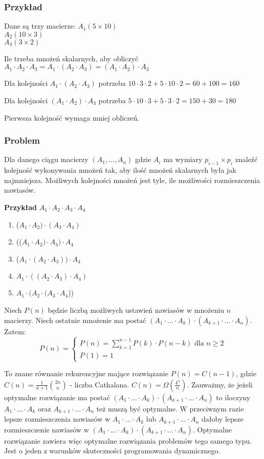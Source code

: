 \subsubsection{Przykład}
Dane są trzy macierze:
$ A_1 (5 \times 10) $\\ 
$ A_2 (10 \times 3) $\\
$ A_3 (3 \times 2) $


Ile trzeba mnożeń skalarnych, aby obliczyć $A_1 \cdot A_2 \cdot A_3 = A_1 \cdot (A_2 \cdot A_3) = (A_1 \cdot A_2) \cdot A_3$

Dla kolejności $A_1 \cdot (A_2 \cdot A_3)$ potrzeba $10 \cdot 3 \cdot 2 + 5 \cdot  10 \cdot 2 = 60 + 100 = 160$

Dla kolejności $(A_1 \cdot A_2) \cdot A_3$ potrzeba $5 \cdot 10 \cdot 3 + 5 \cdot 3 \cdot 2 = 150 + 30 = 180$

Pierwsza kolejność wymaga mniej obliczeń.

\subsubsection{Problem}
Dla danego ciągu macierzy $(A_1, ...,  A_n)$ gdzie $A_i$ ma wymiary $p_{i-1} \times p_i$ znaleźć kolejność wykonywania mnożeń tak, aby ilość mnożeń skalarnych była jak najmniejsza. 
Możliwych kolejności mnożeń jest tyle, ile możliwości rozmieszczenia nawiasów.

\textbf{Przykład} $A_1 \cdot A_2 \cdot A_3 \cdot A_4$
\begin{enumerate}
\item ($A_1 \cdot A_2) \cdot (A_3 \cdot A_4)$
\item (($A_1 \cdot A_2) \cdot A_3) \cdot A_4$
\item ($A_1 \cdot (A_2 \cdot A_3)) \cdot A_4$
\item $A_1 \cdot ((A_2 \cdot A_3) \cdot A_4)$
\item $A_1 \cdot (A_2 \cdot (A_3 \cdot A_4$))
\end{enumerate}
Niech $P(n)$ będzie liczbą możliwych ustawień nawiasów w mnożeniu $n$ macierzy. Niech ostatnie mnożenie ma postać $(A_1 \cdot ... \cdot A_k) \cdot (A_{k+1} \cdot ... \cdot A_n)$. Zatem:
$$
P(n) = 	\begin{cases}
		P(n) = \sum_{k=1}^{n-1} P(k) \cdot P(n-k) \text{ dla } n \geq 2 \\
		P(1) = 1
		\end{cases}
$$

To znane równanie rekurencyjne mające rozwiązanie $P(n) = C(n-1)$, gdzie $C(n) = \frac{1}{n+1}\binom{2n}{n}$ - liczba Cathalana. $C(n) = \Omega(\frac{4^n}{n})$. Zauważmy, że jeżeli optymalne rozwiązanie ma postać $(A_1 \cdot ... \cdot A_k) \cdot (A_{k+1} \cdot ... \cdot A_n)$ to iloczyny $A_1 \cdot ... \cdot A_k$ oraz $A_{k+1} \cdot ... \cdot A_n$  też muszą być optymalne. W przeciwnym razie lepsze rozmieszczenia nawiasów w $A_1 \cdot ... \cdot A_k$ lub $A_{k+1} \cdot ... \cdot A_n$ dałoby lepsze rozmieszczenie nawiasów w $(A_1 \cdot ... \cdot A_k) \cdot (A_{k+1} \cdot ... \cdot A_n)$. Optymalne rozwiązanie zawiera więc optymalne rozwiązania problemów tego samego typu. Jest o jeden z warunków skuteczności programowania dynamicznego.



